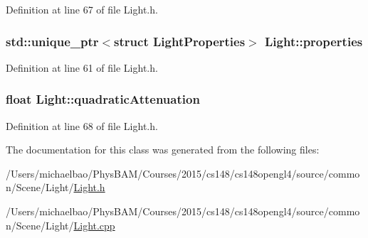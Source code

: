 Definition at line 67 of file Light.\+h.

\hypertarget{class_light_a74eba4cac1cc27e741230fbda32fceef}{}
\subsubsection[{properties}]{\setlength{\rightskip}{0pt plus 5cm}std\+::unique\+\_\+ptr$<$struct {\bf Light\+Properties}$>$ Light\+::properties\hspace{0.3cm}{\ttfamily [private]}}\label{class_light_a74eba4cac1cc27e741230fbda32fceef}


Definition at line 61 of file Light.\+h.

\hypertarget{class_light_a0f24dde11cbbd12d0f0309e189f3640c}{}
\subsubsection[{quadratic\+Attenuation}]{\setlength{\rightskip}{0pt plus 5cm}float Light\+::quadratic\+Attenuation\hspace{0.3cm}{\ttfamily [private]}}\label{class_light_a0f24dde11cbbd12d0f0309e189f3640c}


Definition at line 68 of file Light.\+h.



The documentation for this class was generated from the following files\+:\begin{DoxyCompactItemize}
\item 
/\+Users/michaelbao/\+Phys\+B\+A\+M/\+Courses/2015/cs148/cs148opengl4/source/common/\+Scene/\+Light/\hyperlink{_light_8h}{Light.\+h}\item 
/\+Users/michaelbao/\+Phys\+B\+A\+M/\+Courses/2015/cs148/cs148opengl4/source/common/\+Scene/\+Light/\hyperlink{_light_8cpp}{Light.\+cpp}\end{DoxyCompactItemize}

